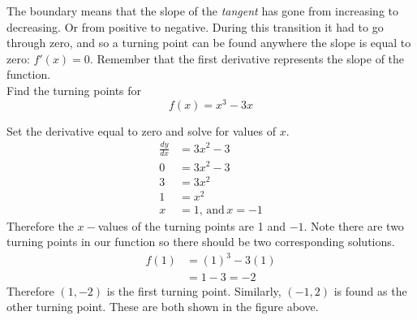 \begin{multicols}{2}
The boundary means that the slope of the \textit{tangent} has gone from increasing to decreasing. Or from positive to negative. During this transition it had to go through zero, and so a turning point can be found anywhere the slope is equal to zero: $f'(x)=0$. Remember that the first derivative represents the slope of the function.  \\

\example Find the turning points for \[f(x)=x^3-3x\]
\columnbreak
	\begin{center}
	\end{center}
\end{multicols}
\solution 
\begin{multicols}{2}
Set the derivative equal to zero and solve for values of $x$.
\begin{align*}
\frac{dy}{dx}&=3x^2-3\\
0&=3x^2-3\\
3&=3x^2\\
1&=x^2\\
x&=1, \,\mathrm{ and }\, x=-1
\end{align*}
Therefore the $x-$values of the turning points are 1 and $-1$. Note there are two turning points in our function so there should be two corresponding solutions.\\
\begin{align*}
f(1)&=(1)^3-3(1)\\
&=1-3=-2
\end{align*}
Therefore $(1,-2)$ is the first turning point. Similarly, $(-1,2)$ is found as the other turning point. These are both shown in the figure above.\end{multicols}

